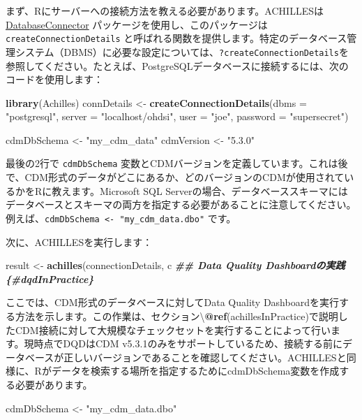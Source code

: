 \documentclass[
  11pt]{book}
\newenvironment{Shaded}{\begin{snugshade}}{\end{snugshade}}
\newcommand{\AttributeTok}[1]{\textcolor[rgb]{0.13,0.29,0.53}{#1}}
\newcommand{\DocumentationTok}[1]{\textcolor[rgb]{0.56,0.35,0.01}{\textbf{\textit{#1}}}}
\newcommand{\FloatTok}[1]{\textcolor[rgb]{0.00,0.00,0.81}{#1}}
\newcommand{\FunctionTok}[1]{\textcolor[rgb]{0.13,0.29,0.53}{\textbf{#1}}}
\newcommand{\NormalTok}[1]{#1}
\newcommand{\OtherTok}[1]{\textcolor[rgb]{0.56,0.35,0.01}{#1}}
\newcommand{\SpecialCharTok}[1]{\textcolor[rgb]{0.81,0.36,0.00}{\textbf{#1}}}
\newcommand{\StringTok}[1]{\textcolor[rgb]{0.31,0.60,0.02}{#1}}
\theoremstyle{definition}
\theoremstyle{definition}
\theoremstyle{definition}
\theoremstyle{definition}
\theoremstyle{remark}
\begin{document}
まず、Rにサーバーへの接続方法を教える必要があります。ACHILLESは \href{https://ohdsi.github.io/DatabaseConnector/}{DatabaseConnector} パッケージを使用し、このパッケージは \texttt{createConnectionDetails} と呼ばれる関数を提供します。特定のデータベース管理システム（DBMS）に必要な設定については、\texttt{?createConnectionDetails}を参照してください。たとえば、PostgreSQLデータベースに接続するには、次のコードを使用します：

\begin{Shaded}
\begin{Highlighting}[]
\FunctionTok{library}\NormalTok{(Achilles)}
\NormalTok{connDetails }\OtherTok{\textless{}{-}} \FunctionTok{createConnectionDetails}\NormalTok{(}\AttributeTok{dbms =} \StringTok{"postgresql"}\NormalTok{,}
                                       \AttributeTok{server =} \StringTok{"localhost/ohdsi"}\NormalTok{,}
                                       \AttributeTok{user =} \StringTok{"joe"}\NormalTok{,}
                                       \AttributeTok{password =} \StringTok{"supersecret"}\NormalTok{)}

\NormalTok{cdmDbSchema }\OtherTok{\textless{}{-}} \StringTok{"my\_cdm\_data"}
\NormalTok{cdmVersion }\OtherTok{\textless{}{-}} \StringTok{"5.3.0"}
\end{Highlighting}
\end{Shaded}

最後の2行で \texttt{cdmDbSchema} 変数とCDMバージョンを定義しています。これは後で、CDM形式のデータがどこにあるか、どのバージョンのCDMが使用されているかをRに教えます。Microsoft SQL Serverの場合、データベーススキーマにはデータベースとスキーマの両方を指定する必要があることに注意してください。例えば、\texttt{cdmDbSchema\ \textless{}-\ "my\_cdm\_data.dbo"} です。

次に、ACHILLESを実行します：

\begin{Shaded}
\begin{Highlighting}[]
\NormalTok{result }\OtherTok{\textless{}{-}} \FunctionTok{achilles}\NormalTok{(connectionDetails,}
\NormalTok{                   c}
\DocumentationTok{\#\# Data Quality Dashboardの実践 \{\#dqdInPractice\}}

\NormalTok{ここでは、CDM形式のデータベースに対してData Quality Dashboardを実行する方法を示します。この作業は、セクション\textbackslash{}}\SpecialCharTok{@}\FunctionTok{ref}\NormalTok{(achillesInPractice)で説明したCDM接続に対して大規模なチェックセットを実行することによって行います。現時点でDQDはCDM v5.}\FloatTok{3.1}\NormalTok{のみをサポートしているため、接続する前にデータベースが正しいバージョンであることを確認してください。ACHILLESと同様に、Rがデータを検索する場所を指定するために}\StringTok{\textasciigrave{}}\AttributeTok{cdmDbSchema}\StringTok{\textasciigrave{}}\NormalTok{変数を作成する必要があります。}

\NormalTok{cdmDbSchema }\OtherTok{\textless{}{-}} \StringTok{"my\_cdm\_data.dbo"}
\end{Highlighting}
\end{Shaded}
\end{document}
